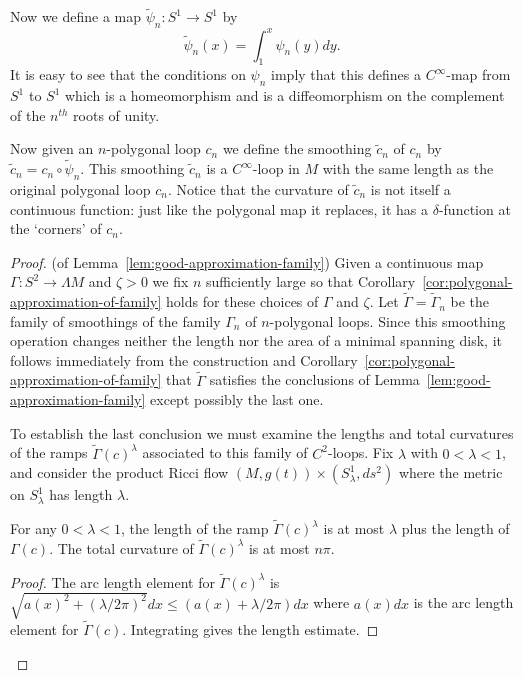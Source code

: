  Now we define a map $\tilde\psi_n\colon S^1\to S^1$ by
$$\tilde \psi_n(x)= \int_{1}^x\psi_n(y)dy.$$ It is easy to see that
the conditions on $\psi_n$ imply that this defines a $C^\infty$-map
from $S^1$ to $S^1$ which is a homeomorphism and is a diffeomorphism
on the complement of the $n^{th}$ roots of unity.

Now given an $n$-polygonal loop $c_n$ we define the smoothing
$\tilde c_n$ of $c_n$ by $\tilde c_n=c_n\circ \tilde \psi_n$. This
smoothing $\tilde c_n$ is a $C^\infty$-loop in $M$ with the same
length as the original polygonal loop $c_n$. Notice that the
curvature of $\tilde c_n$ is not itself a continuous function: just
like the polygonal map it replaces, it has a $\delta$-function at
the `corners' of $c_n$.


\begin{proof}
 (of Lemma~\ref{lem:good-approximation-family})
Given a continuous map $\Gamma\colon S^2\to \Lambda M$ and $\zeta>0$
we fix $n$ sufficiently large so that Corollary~\ref{cor:polygonal-approximation-of-family}
holds for these choices of $\Gamma$ and $\zeta$. Let $\widetilde
\Gamma=\widetilde \Gamma_n$ be the family of smoothings of the
family $\Gamma_n$ of $n$-polygonal loops. Since this smoothing
operation changes neither the length nor the area of a minimal
spanning disk, it follows  immediately from the construction and
Corollary~\ref{cor:polygonal-approximation-of-family} that $\widetilde \Gamma$ satisfies the
conclusions of Lemma~\ref{lem:good-approximation-family} except possibly the last one.


To establish the last conclusion we must examine the lengths and
total curvatures of the ramps $\widetilde \Gamma(c)^\lambda$
associated to this family of $C^2$-loops. Fix $\lambda$ with
$0<\lambda<1$, and consider the product Ricci flow $(M,g(t))\times
(S^1_\lambda,ds^2)$ where the metric on $S^1_\lambda$ has length
$\lambda$.

\begin{claim}
\label{claim:smoothed-approximation-ramp-bounds}
For any $0<\lambda<1$, the length of the ramp $\widetilde
\Gamma(c)^\lambda$ is at most $\lambda$ plus the length of
$\Gamma(c)$. The total curvature of $\widetilde\Gamma(c)^\lambda$ is
at most $n\pi$.
\end{claim}

\begin{proof}
The arc length element for $\widetilde \Gamma(c)^\lambda$ is
$\sqrt{a(x)^2+(\lambda/2\pi)^2}dx\le (a(x)+\lambda/2\pi)dx$ where
$a(x)dx$ is the arc length element for $\widetilde\Gamma(c)$.
Integrating gives the length estimate.


\end{proof}
\end{proof}
